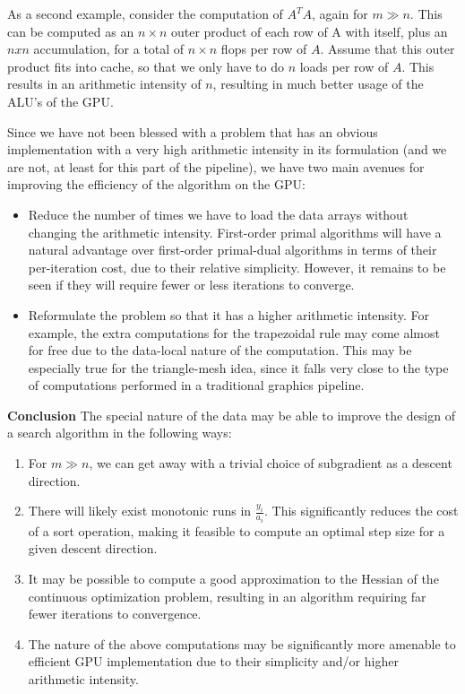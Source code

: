 As a second example, consider the computation of $A^T A$, again for $m \gg n$.
This can be computed as an $n \times n$ outer product of each row of A with
itself, plus an $n x n$ accumulation, for a total of $n \times n$ flops per row
of $A$.  Assume that this outer product fits into cache, so that we only have
to do $n$ loads per row of $A$.  This results in an arithmetic intensity of
$n$, resulting in much better usage of the ALU's of the GPU.

Since we have not been blessed with a problem that has an obvious
implementation with a very high arithmetic intensity in its formulation (and we
are not, at least for this part of the pipeline), we have two main avenues for
improving the efficiency of the algorithm on the GPU:

\begin{itemize}
\item Reduce the number of times we have to load the data arrays without
changing the arithmetic intensity.  First-order primal algorithms will have a
natural advantage over first-order primal-dual algorithms in terms of their
per-iteration cost, due to their relative simplicity.  However, it remains to
be seen if they will require fewer or less iterations to converge.

\item Reformulate the problem so that it has a higher arithmetic intensity.
For example, the extra computations for the trapezoidal rule may come almost
for free due to the data-local nature of the computation.  This may be
especially true for the triangle-mesh idea, since it falls very close to the
type of computations performed in a traditional graphics pipeline.

\end{itemize}


{\bf Conclusion } The special nature of the data may be able to improve the design of a search algorithm in the following ways:
\begin{enumerate}
\item For $m \gg n$, we can get away with a trivial choice of subgradient as a descent direction.
\item There will likely exist monotonic runs in $\frac{y_i}{a_i}$.  This significantly reduces the cost of a sort operation, making it feasible to compute an optimal step size for a given descent direction.  
\item It may be possible to compute a good approximation to the Hessian of the continuous optimization problem, resulting in an algorithm requiring far fewer iterations to convergence.  
\item The nature of the above computations may be significantly more amenable to efficient GPU implementation due to their simplicity and/or higher arithmetic intensity.
\end{enumerate}

